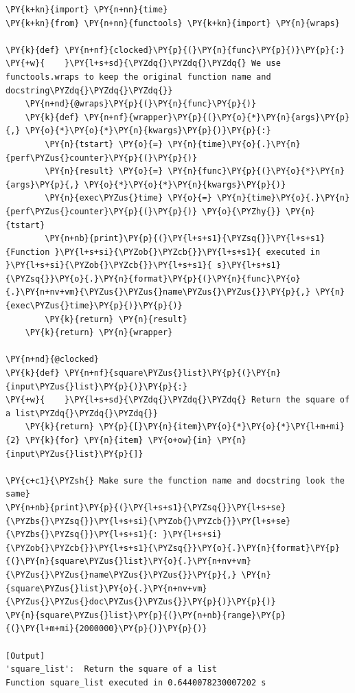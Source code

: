 \begin{Verbatim}[label=\makebox{\url{https://github.com/lucabaldini/cmepda/tree/master/slides/latex/snippets/time\_measuring\_decor.py}},commandchars=\\\{\}]
\PY{k+kn}{import} \PY{n+nn}{time} 
\PY{k+kn}{from} \PY{n+nn}{functools} \PY{k+kn}{import} \PY{n}{wraps}

\PY{k}{def} \PY{n+nf}{clocked}\PY{p}{(}\PY{n}{func}\PY{p}{)}\PY{p}{:}
\PY{+w}{    }\PY{l+s+sd}{\PYZdq{}\PYZdq{}\PYZdq{} We use functools.wraps to keep the original function name and docstring\PYZdq{}\PYZdq{}\PYZdq{}}
    \PY{n+nd}{@wraps}\PY{p}{(}\PY{n}{func}\PY{p}{)}
    \PY{k}{def} \PY{n+nf}{wrapper}\PY{p}{(}\PY{o}{*}\PY{n}{args}\PY{p}{,} \PY{o}{*}\PY{o}{*}\PY{n}{kwargs}\PY{p}{)}\PY{p}{:}
        \PY{n}{tstart} \PY{o}{=} \PY{n}{time}\PY{o}{.}\PY{n}{perf\PYZus{}counter}\PY{p}{(}\PY{p}{)}
        \PY{n}{result} \PY{o}{=} \PY{n}{func}\PY{p}{(}\PY{o}{*}\PY{n}{args}\PY{p}{,} \PY{o}{*}\PY{o}{*}\PY{n}{kwargs}\PY{p}{)}
        \PY{n}{exec\PYZus{}time} \PY{o}{=} \PY{n}{time}\PY{o}{.}\PY{n}{perf\PYZus{}counter}\PY{p}{(}\PY{p}{)} \PY{o}{\PYZhy{}} \PY{n}{tstart}
        \PY{n+nb}{print}\PY{p}{(}\PY{l+s+s1}{\PYZsq{}}\PY{l+s+s1}{Function }\PY{l+s+si}{\PYZob{}\PYZcb{}}\PY{l+s+s1}{ executed in }\PY{l+s+si}{\PYZob{}\PYZcb{}}\PY{l+s+s1}{ s}\PY{l+s+s1}{\PYZsq{}}\PY{o}{.}\PY{n}{format}\PY{p}{(}\PY{n}{func}\PY{o}{.}\PY{n+nv+vm}{\PYZus{}\PYZus{}name\PYZus{}\PYZus{}}\PY{p}{,} \PY{n}{exec\PYZus{}time}\PY{p}{)}\PY{p}{)}
        \PY{k}{return} \PY{n}{result}
    \PY{k}{return} \PY{n}{wrapper}

\PY{n+nd}{@clocked}
\PY{k}{def} \PY{n+nf}{square\PYZus{}list}\PY{p}{(}\PY{n}{input\PYZus{}list}\PY{p}{)}\PY{p}{:}
\PY{+w}{    }\PY{l+s+sd}{\PYZdq{}\PYZdq{}\PYZdq{} Return the square of a list\PYZdq{}\PYZdq{}\PYZdq{}}
    \PY{k}{return} \PY{p}{[}\PY{n}{item}\PY{o}{*}\PY{o}{*}\PY{l+m+mi}{2} \PY{k}{for} \PY{n}{item} \PY{o+ow}{in} \PY{n}{input\PYZus{}list}\PY{p}{]}

\PY{c+c1}{\PYZsh{} Make sure the function name and docstring look the same}
\PY{n+nb}{print}\PY{p}{(}\PY{l+s+s1}{\PYZsq{}}\PY{l+s+se}{\PYZbs{}\PYZsq{}}\PY{l+s+si}{\PYZob{}\PYZcb{}}\PY{l+s+se}{\PYZbs{}\PYZsq{}}\PY{l+s+s1}{: }\PY{l+s+si}{\PYZob{}\PYZcb{}}\PY{l+s+s1}{\PYZsq{}}\PY{o}{.}\PY{n}{format}\PY{p}{(}\PY{n}{square\PYZus{}list}\PY{o}{.}\PY{n+nv+vm}{\PYZus{}\PYZus{}name\PYZus{}\PYZus{}}\PY{p}{,} \PY{n}{square\PYZus{}list}\PY{o}{.}\PY{n+nv+vm}{\PYZus{}\PYZus{}doc\PYZus{}\PYZus{}}\PY{p}{)}\PY{p}{)}
\PY{n}{square\PYZus{}list}\PY{p}{(}\PY{n+nb}{range}\PY{p}{(}\PY{l+m+mi}{2000000}\PY{p}{)}\PY{p}{)}

[Output]
'square_list':  Return the square of a list
Function square_list executed in 0.6440078230007202 s
\end{Verbatim}
